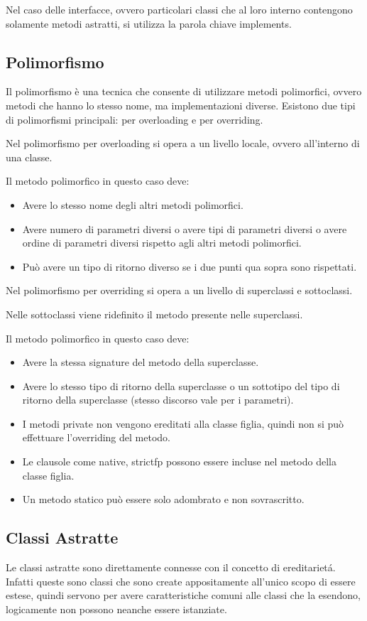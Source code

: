 \documentclass[a4paper,12pt]{article}
\begin{document}
Nel caso delle interfacce, ovvero particolari classi che al loro interno contengono solamente metodi astratti, si utilizza la parola chiave implements.
\textcite{corsoinformatica}

\subsection{Polimorfismo}
Il polimorfismo è una tecnica che consente di utilizzare metodi polimorfici, ovvero metodi che hanno lo stesso nome, ma implementazioni diverse.
Esistono due tipi di polimorfismi principali: per overloading e per overriding.

Nel polimorfismo per overloading si opera a un livello locale, ovvero all’interno di una classe.

Il metodo polimorfico in questo caso deve:
\begin{itemize}
	\item Avere lo stesso nome degli altri metodi polimorfici.
	\item Avere numero di parametri diversi o avere tipi di parametri diversi o avere ordine di parametri diversi rispetto agli altri metodi polimorfici.
	\item Può avere un tipo di ritorno diverso se i due punti qua sopra sono rispettati.
\end{itemize}
Nel polimorfismo per overriding si opera a un livello di superclassi e sottoclassi.

Nelle sottoclassi viene ridefinito il metodo presente nelle superclassi.

Il metodo polimorfico in questo caso deve:
\begin{itemize}
	\item Avere la stessa signature del metodo della superclasse.
	\item Avere lo stesso tipo di ritorno della superclasse o un sottotipo del tipo di ritorno della superclasse (stesso discorso vale per i parametri).
	\item I metodi private non vengono ereditati alla classe figlia, quindi non si può effettuare l’overriding del metodo.
	\item Le clausole come native, strictfp possono essere incluse nel metodo della classe figlia.
	\item Un metodo statico può essere solo adombrato e non sovrascritto.
\end{itemize}
\textcite{polimorfismo}

\subsection{Classi Astratte}
Le classi astratte sono direttamente connesse con il concetto di ereditarietá. Infatti queste sono classi che sono create appositamente all'unico scopo di essere estese, quindi servono per avere caratteristiche comuni alle classi che la esendono, logicamente non possono neanche essere istanziate.
\end{document}

